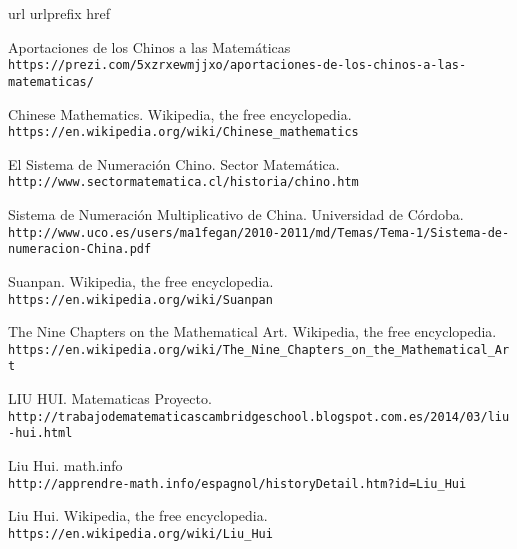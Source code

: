 \begin{thebibliography}{10}
\expandafter\ifx\csname url\endcsname\relax
  \def\url#1{\texttt{#1}}\fi
\expandafter\ifx\csname urlprefix\endcsname\relax\def\urlprefix{URL }\fi
\expandafter\ifx\csname href\endcsname\relax
  \def\href#1#2{#2} \def\path#1{#1}\fi

Aportaciones de los Chinos a las Matemáticas\\
  \url{https://prezi.com/5xzrxewmjjxo/aportaciones-de-los-chinos-a-las-matematicas/}

Chinese Mathematics. Wikipedia, the free encyclopedia.\\
  \url{https://en.wikipedia.org/wiki/Chinese_mathematics}

El Sistema de Numeración Chino. Sector Matemática.\\
  \url{http://www.sectormatematica.cl/historia/chino.htm}

Sistema de Numeración Multiplicativo de China. Universidad de Córdoba.\\
  \url{http://www.uco.es/users/ma1fegan/2010-2011/md/Temas/Tema-1/Sistema-de-numeracion-China.pdf}

Suanpan. Wikipedia, the free encyclopedia.\\
  \url{https://en.wikipedia.org/wiki/Suanpan}
  
The Nine Chapters on the Mathematical Art. Wikipedia, the free encyclopedia.\\
  \url{https://en.wikipedia.org/wiki/The_Nine_Chapters_on_the_Mathematical_Art}  
  
LIU HUI. Matematicas Proyecto.\\
  \url{http://trabajodematematicascambridgeschool.blogspot.com.es/2014/03/liu-hui.html}

Liu Hui. math.info\\
  \url{http://apprendre-math.info/espagnol/historyDetail.htm?id=Liu_Hui}
  
Liu Hui. Wikipedia, the free encyclopedia.\\
  \url{https://en.wikipedia.org/wiki/Liu_Hui}

\end{thebibliography}
